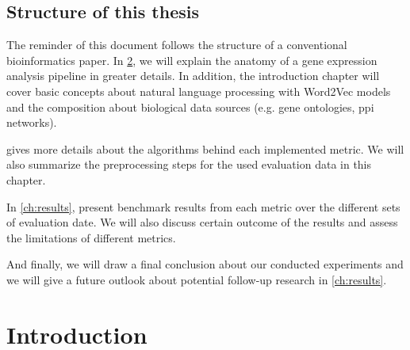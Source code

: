 \documentclass{thesisclass}
\begin{document}
\section{Structure of this thesis}

The reminder of this document follows the structure of a conventional bioinformatics paper. In \cref{ch:introduction}, we will explain the anatomy of a gene expression analysis pipeline in greater details. In addition, the introduction chapter will cover basic concepts about natural language processing with Word2Vec models and the composition about biological data sources (e.g. gene ontologies, \acrshort{ppi} networks).

 gives more details about the algorithms behind each implemented metric. We will also summarize the preprocessing steps for the used evaluation data in this chapter.

In \cref{ch:results}, present benchmark results from each metric over the different sets of evaluation date. We will also discuss certain outcome of the results and assess the limitations of different metrics. 

And finally, we will draw a final conclusion about our conducted experiments and we will give a future outlook about potential follow-up research in \cref{ch:results}.

\chapter{Introduction}  \label{ch:introduction}
\end{document}
